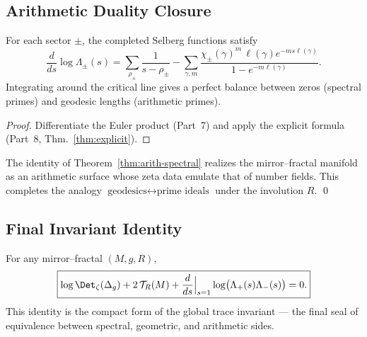 
\subsection{Arithmetic Duality Closure}
\label{subsec:ch6-part9-duality} \relax \hspace{0pt}
\begin{theorem}
\label{thm:arith-spectral}
For each sector $\pm$, the completed Selberg functions satisfy
\[
\frac{d}{ds}\log\Lambda_\pm(s)
=\sum_{\rho_\pm}\frac{1}{s-\rho_\pm}
- \sum_{\gamma,m}
\frac{\chi_\pm(\gamma)^m\,\ell(\gamma)e^{-ms\ell(\gamma)}}{1-e^{-m\ell(\gamma)}}.
\]
Integrating around the critical line gives a perfect balance between zeros (spectral primes) and geodesic lengths (arithmetic primes).  
\end{theorem}

\begin{proof}
Differentiate the Euler product (Part~7) and apply the explicit formula (Part~8, Thm.~\ref{thm:explicit}).  
\end{proof}

\begin{remark}
\label{rem:fract-arith}
The identity of Theorem~\ref{thm:arith-spectral} realizes the mirror–fractal manifold as an arithmetic surface whose zeta data emulate that of number fields.  
This completes the analogy $\text{geodesics}\leftrightarrow\text{prime ideals}$ under the involution $R$.  
\qed {} %
\end{remark}


\subsection{Final Invariant Identity}
\label{subsec:ch6-part9-final} \relax \hspace{0pt}
\begin{theorem}
\label{thm:final-ledger}
For any mirror–fractal $(M,g,R)$,
\[
\boxed{
\log\Det_\zeta(\Delta_g)
+2\,\mathcal{T}_R(M)
+\frac{d}{ds}\Big|_{s=1}\log\!\big(\Lambda_+(s)\Lambda_-(s)\big)
=0.
}
\]
This identity is the compact form of the global trace invariant — the final seal of equivalence between spectral, geometric, and arithmetic sides.  
\end{theorem}

